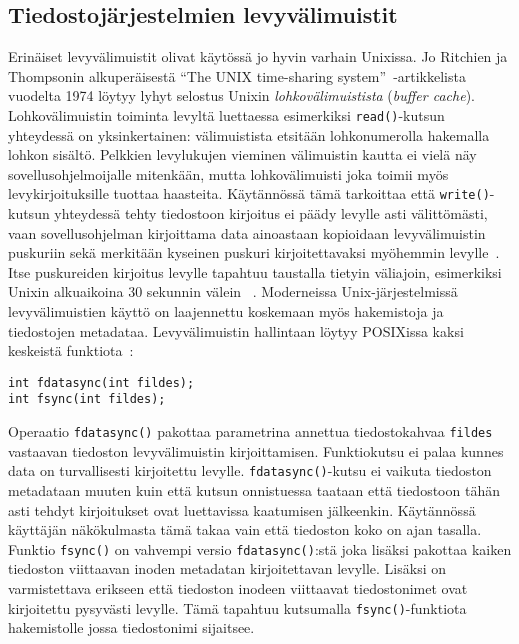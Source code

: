 \subsection{Tiedostojärjestelmien levyvälimuistit}

Erinäiset levyvälimuistit olivat käytössä jo hyvin varhain Unixissa.
Jo Ritchien ja Thompsonin alkuperäisestä ``The UNIX time-sharing system''~\cite{UnixPaper}-artikkelista vuodelta 1974 löytyy lyhyt selostus Unixin \emph{lohkovälimuistista} (\emph{buffer cache}).
Lohkovälimuistin toiminta levyltä luettaessa esimerkiksi \texttt{read()}-kutsun yhteydessä on yksinkertainen:
välimuistista etsitään lohkonumerolla hakemalla lohkon sisältö.
Pelkkien levylukujen vieminen välimuistin kautta ei vielä näy sovellusohjelmoijalle mitenkään,
mutta lohkovälimuisti joka toimii myös levykirjoituksille tuottaa haasteita.
Käytännössä tämä tarkoittaa että \texttt{write()}-kutsun yhteydessä tehty tiedostoon kirjoitus ei päädy levylle asti välittömästi,
vaan sovellusohjelman kirjoittama data ainoastaan kopioidaan levyvälimuistin puskuriin sekä merkitään kyseinen puskuri kirjoitettavaksi myöhemmin levylle~\cite{UnixPaper}.
Itse puskureiden kirjoitus levylle tapahtuu taustalla tietyin väliajoin,
esimerkiksi Unixin alkuaikoina 30 sekunnin välein ~\cite{SpriteRosenblumThesis}.
Moderneissa Unix-järjestelmissä levyvälimuistien käyttö on laajennettu koskemaan myös hakemistoja ja tiedostojen metadataa.
%
%
Levyvälimuistin hallintaan löytyy POSIXissa kaksi keskeistä funktiota~\cite{PosixSpec}:
\begin{verbatim}
int fdatasync(int fildes);
int fsync(int fildes);
\end{verbatim}
%
Operaatio \texttt{fdatasync()} pakottaa parametrina annettua tiedostokahvaa \texttt{fildes} vastaavan tiedoston levyvälimuistin kirjoittamisen.
Funktiokutsu ei palaa kunnes data on turvallisesti kirjoitettu levylle.
\texttt{fdatasync()}-kutsu ei vaikuta tiedoston metadataan muuten kuin että kutsun onnistuessa taataan että tiedostoon tähän asti tehdyt kirjoitukset ovat luettavissa kaatumisen jälkeenkin.
Käytännössä käyttäjän näkökulmasta tämä takaa vain että tiedoston koko on ajan tasalla.
Funktio \texttt{fsync()} on vahvempi versio \texttt{fdatasync()}:stä joka lisäksi pakottaa kaiken tiedoston viittaavan inoden metadatan kirjoitettavan levylle.
Lisäksi on varmistettava erikseen että tiedoston inodeen viittaavat tiedostonimet ovat kirjoitettu pysyvästi levylle.
Tämä tapahtuu kutsumalla \texttt{fsync()}-funktiota hakemistolle jossa tiedostonimi sijaitsee.

